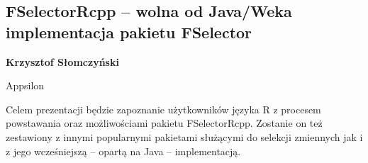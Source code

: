 \documentclass[\main/boa.tex]{subfiles}
\begin{document}
\subsection{FSelectorRcpp – wolna od Java/Weka implementacja pakietu FSelector}

\begin{minipage}{0.915\textwidth}
	\centering
  {\bf {} Krzysztof Słomczyński}
\end{minipage}

\vskip 0.3cm

\begin{affiliations}
\begin{minipage}{0.915\textwidth}
\centering
Appsilon \\[-2pt]
\end{minipage}
\end{affiliations}

\vskip 0.8cm

Celem prezentacji będzie zapoznanie użytkowników języka R z procesem powstawania oraz możliwościami pakietu FSelectorRcpp. Zostanie on też zestawiony z innymi popularnymi pakietami służącymi do selekcji zmiennych jak i z jego wcześniejszą – opartą na Java – implementacją. 
\end{document}
